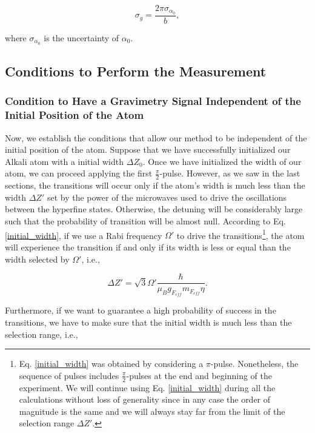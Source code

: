 \documentclass{article}
\begin{document}
\begin{equation}
    \sigma_{g} = \frac{2\pi \sigma_{\alpha_{0}}}{b},
\end{equation}

where $\sigma_{\alpha_{0}}$ is the uncertainty of $\alpha_{0}$.

\subsection{Conditions to Perform the Measurement}

\subsubsection{Condition to Have a Gravimetry Signal Independent of the Initial Position of the Atom}
Now, we establish the conditions that allow our method to be independent of the initial position of the atom.
Suppose that we have successfully initialized our Alkali atom with a initial width $\Delta Z_{0}$. Once we have initialized the width of our atom, we can proceed applying the first $\frac{\pi}{2}$-pulse. However, as we saw in the last sections, the transitions will occur only if the atom's width is much less than the width $\Delta Z'$ set by the power of the microwaves used to drive the oscillations between the hyperfine states. Otherwise, the detuning will be considerably large such that the probability of transition will be almost null. According to Eq. \ref{initial_width}, if we use a Rabi frequency $\Omega'$ to drive the transitions\footnote{Eq. \ref{initial_width} was obtained by considering a $\pi$-pulse. Nonetheless, the sequence of pulses includes $\frac{\pi}{2}$-pulses at the end and beginning of the experiment. We will continue using Eq. \ref{initial_width} during all the calculations without loss of generality since in any case the order of magnitude is the same and we will always stay far from the limit of the selection range $\Delta Z'$.}, the atom will experience the transition if and only if its width is less or equal than the width selected by $\Omega'$, i.e.,

\begin{equation}\label{maximum_width_rabi_frequency}
    \Delta Z' = \sqrt{3} \Omega' \frac{\hbar}{\mu_{B} g_{F_{eff}} m_{F_{eff}} \eta}.
\end{equation}

Furthermore, if we want to guarantee a high probability of success in the transitions, we have to make sure that the initial width is much less than the selection range, i.e.,
\end{document}
